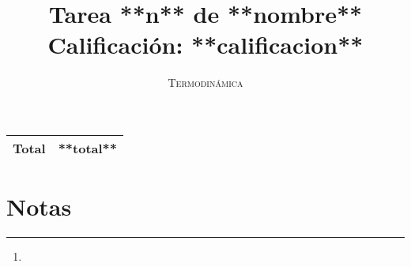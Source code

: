 \documentclass{article}
\begin{document}
\title{Tarea **n** de **nombre** \\
       \Large{Calificación: \textbf{**calificacion**}}}
\author{\textsc{Termodinámica}}
\date{}
\maketitle

\begin{center}
    \begin{tabular}{cc}
    \hline
    \hline
    \textbf{Total} & **total** \\
    \hline
    \end{tabular}
\end{center}

\section*{Notas}

\begin{center}
    \rule{0.8\textwidth}{1pt}
\end{center}

\begin{enumerate}
    \item
\end{enumerate}
\end{document}
